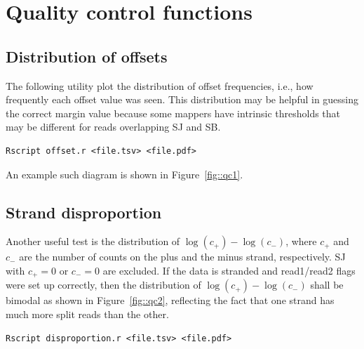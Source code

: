 \documentclass{article}
\begin{document}
\section{Quality control functions}
\subsection{Distribution of offsets}
The following utility plot the distribution of offset frequencies, i.e., how frequently each offset value was seen. This distribution may be helpful 
in guessing the correct margin value because some mappers have intrinsic thresholds that may be different for reads overlapping SJ and SB.
\begin{verbatim}
Rscript offset.r <file.tsv> <file.pdf>
\end{verbatim}
An example such diagram is shown in Figure~\ref{fig::qc1}.
\begin{figure}
\end{figure}

\subsection{Strand disproportion}
Another useful test is the distribution of $\log(c_+) - \log(c_-)$, where $c_+$ and $c_-$ are the number of counts on the plus and the minus strand, 
respectively. SJ with $c_+=0$ or $c_-=0$ are excluded. If the data is stranded and read1/read2 flags were set up correctly, then the distribution of
$\log(c_+) - \log(c_-)$ shall be bimodal as shown in Figure~\ref{fig::qc2}, reflecting the fact that one strand has much more split reads than 
the other.
\begin{verbatim}
Rscript disproportion.r <file.tsv> <file.pdf>
\end{verbatim}
\end{document}
